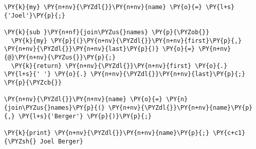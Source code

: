 \begin{Verbatim}[commandchars=\\\{\}]
\PY{k}{my} \PY{n+nv}{\PYZdl{}}\PY{n+nv}{name} \PY{o}{=} \PY{l+s}{'Joel'}\PY{p}{;}

\PY{k}{sub }\PY{n+nf}{join\PYZus{}names} \PY{p}{\PYZob{}}
  \PY{k}{my} \PY{p}{(}\PY{n+nv}{\PYZdl{}}\PY{n+nv}{first}\PY{p}{,} \PY{n+nv}{\PYZdl{}}\PY{n+nv}{last}\PY{p}{)} \PY{o}{=} \PY{n+nv}{@}\PY{n+nv}{\PYZus{}}\PY{p}{;}
  \PY{k}{return} \PY{n+nv}{\PYZdl{}}\PY{n+nv}{first} \PY{o}{.} \PY{l+s}{' '} \PY{o}{.} \PY{n+nv}{\PYZdl{}}\PY{n+nv}{last}\PY{p}{;}
\PY{p}{\PYZcb{}}

\PY{n+nv}{\PYZdl{}}\PY{n+nv}{name} \PY{o}{=} \PY{n}{join\PYZus{}names}\PY{p}{(} \PY{n+nv}{\PYZdl{}}\PY{n+nv}{name}\PY{p}{,} \PY{l+s}{'Berger'} \PY{p}{)}\PY{p}{;}

\PY{k}{print} \PY{n+nv}{\PYZdl{}}\PY{n+nv}{name}\PY{p}{;} \PY{c+c1}{\PYZsh{} Joel Berger}
\end{Verbatim}
